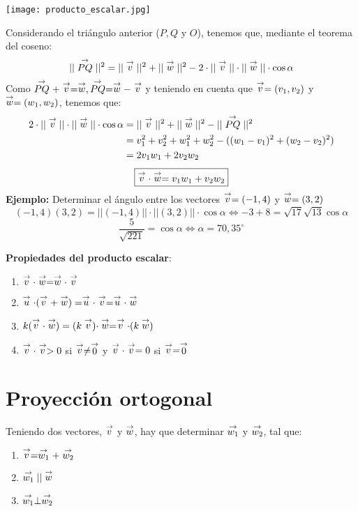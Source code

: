\begin{center}
    \texttt{[image: producto\_escalar.jpg]}
\end{center}
Considerando el triángulo anterior ($P, Q$ y $O$), tenemos que, mediante el teorema del coseno:
$$||\stackrel{\to}{PQ}||^2 = ||\stackrel{\to}{v}||^2 + ||\stackrel{\to}{w}||^2 - 2 \cdot ||\stackrel{\to}{v}||\cdot ||\stackrel{\to}{w}||\cdot \cos \alpha$$
Como $\stackrel{\to}{PQ} + \stackrel{\to}{v} = \stackrel{\to}{w}, \stackrel{\to}{PQ} = \stackrel{\to}{w} - \stackrel{\to}{v}$ y teniendo en cuenta que $\stackrel{\to}{v} = (v_1,v_2)$ y $\stackrel{\to}{w} = (w_1,w_2)$, tenemos que:
\begin{align*}
    2 \cdot ||\stackrel{\to}{v}|| \cdot ||\stackrel{\to}{w}|| \cdot \cos \alpha &= ||\stackrel{\to}{v}||^2 + ||\stackrel{\to}{w}||^2 - ||\stackrel{\to}{PQ}||^2\\
    &= v^2_1 + v^2_2 + w^2_1 + w^2_2 - ((w_1 - v_1) ^2 + (w_2 - v_2)^2)\\
    &= 2v_1w_1 + 2v_2w_2
\end{align*}
$$\boxed{\stackrel{\to}{v} \cdot \stackrel{\to}{w} = v_1w_1 + v_2w_2}$$
\textbf{Ejemplo:} Determinar el ángulo entre los vectores $\stackrel{\to}{v} = (-1,4)$ y $\stackrel{\to}{w} = (3,2)$
$$(-1,4)(3,2) = ||(-1,4)|| \cdot ||(3,2)|| \cdot \cos \alpha \Leftrightarrow -3 +8 = \sqrt{17} \sqrt{13} \cos \alpha$$
$$\frac{5}{\sqrt{221}} = \cos \alpha \Leftrightarrow \boxed{\alpha = 70,35^\circ}$$


\textbf{Propiedades del producto escalar}:
\begin{enumerate}
    \item $\stackrel{\to}{v} \cdot \stackrel{\to}{w} = \stackrel{\to}{w} \cdot \stackrel{\to}{v}$
    \item $\stackrel{\to}{u} \cdot (\stackrel{\to}{v} + \stackrel{\to}{w}) = \stackrel{\to}{u} \cdot \stackrel{\to}{v} = \stackrel{\to}{u} \cdot \stackrel{\to}{w}$
    \item $k(\stackrel{\to}{v} \cdot \stackrel{\to}{w}) = (k\stackrel{\to}{v}) \cdot \stackrel{\to}{w} = \stackrel{\to}{v} \cdot (k\stackrel{\to}{w})$
    \item $\stackrel{\to}{v} \cdot \stackrel{\to}{v} > 0$ si $\stackrel{\to}{v} \neq \stackrel{\to}{0}$ y $\stackrel{\to}{v} \cdot \stackrel{\to}{v} = 0$ si $\stackrel{\to}{v} = \stackrel{\to}{0}$
\end{enumerate}

\section{Proyección ortogonal}
Teniendo dos vectores, $\stackrel{\to}{v}$ y $\stackrel{\to}{w}$, hay que determinar $\stackrel{\to}{w_1}$ y $\stackrel{\to}{w_2}$, tal que:
\begin{enumerate}
    \item $\stackrel{\to}{v} = \stackrel{\to}{w_1} + \stackrel{\to}{w_2}$
    \item $\stackrel{\to}{w_1} || \stackrel{\to}{w}$
    \item $\stackrel{\to}{w_1} \perp \stackrel{\to}{w_2}$
\end{enumerate}

